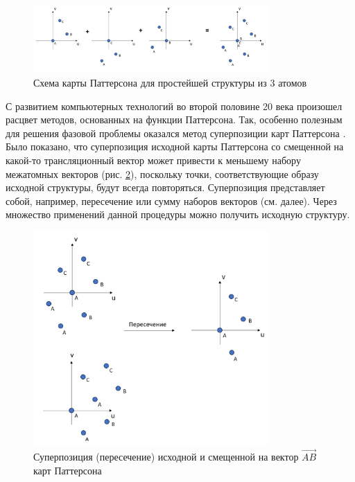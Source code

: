 \begin{figure}[H]
	\centering
	\includegraphics[width=0.8\textwidth]{figures/patterson.png}\hfill
	\caption{Схема карты Паттерсона для простейшей структуры из 3 атомов}
	\label{patterson_image}
\end{figure}

С развитием компьютерных технологий во второй половине 20 века произошел расцвет методов, основанных на функции Паттерсона. Так, особенно полезным для решения фазовой проблемы оказался метод суперпозиции карт Паттерсона \cite{hendrixson_locating_1997}. Было показано, что суперпозиция исходной карты Паттерсона со смещенной на какой-то трансляционный вектор может привести к меньшему набору межатомных векторов (рис. \ref{patt_superposition}), поскольку точки, соответствующие образу исходной структуры, будут всегда повторяться. Суперпозиция представляет собой, например, пересечение или сумму наборов векторов (см. далее). Через множество применений данной процедуры можно получить исходную структуру.

\begin{figure}[H]
	\centering
	\includegraphics[width=0.8\textwidth]{figures/patt_superposition.png}\hfill
	\caption{Суперпозиция (пересечение) исходной и смещенной на вектор $\overrightarrow{AB}$ карт Паттерсона}
	\label{patt_superposition}
\end{figure}

